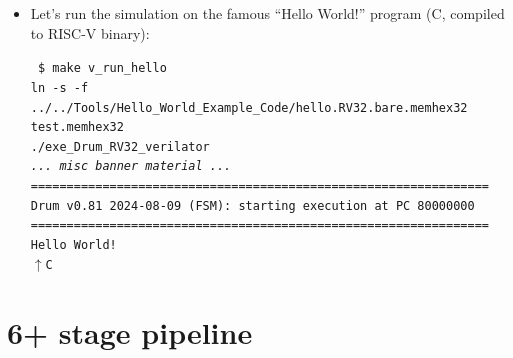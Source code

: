 \begin{frame}[fragile]
\begin{center}
\begin{minipage}{0.8\textwidth}
\begin{itemize}
   \vspace*{1ex}

   ... creates the executable {\tt ./exe\_Drum\_RV32\_verilator}

   \item Let's run the simulation on the famous ``Hello World!''
     program (C, compiled to RISC-V binary):

   \hmm\begin{minipage}{0.8\textwidth}\tiny
     \begin{tabbing}\tt
       \$ make v\_run\_hello \\
       ln -s -f ../../Tools/Hello\_World\_Example\_Code/hello.RV32.bare.memhex32 test.memhex32 \\
       ./exe\_Drum\_RV32\_verilator \\
       {\it ... misc banner material ...} \\
       ================================================================ \\
       Drum v0.81 2024-08-09 (FSM): starting execution at PC 80000000 \\
       ================================================================ \\
       Hello World! \\
       $\uparrow$C
     \end{tabbing}
   \end{minipage}

  \end{itemize}

 \end{minipage}
\end{center}

\end{frame}


\section{{\FIFE} 6+ stage pipeline}

